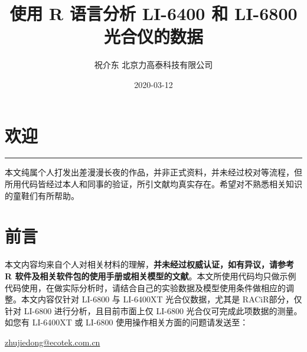 \documentclass[
]{krantz}
\title{使用 R 语言分析 LI-6400 和 LI-6800 光合仪的数据}
\author{祝介东 北京力高泰科技有限公司}
\date{2020-03-12}
\begin{document}
\maketitle





\thispagestyle{empty}

\setlength{\abovedisplayskip}{-5pt}
\setlength{\abovedisplayshortskip}{-5pt}

{
\hypersetup{linkcolor=}
\setcounter{tocdepth}{2}
\tableofcontents
}
\listoftables
\listoffigures
\hypertarget{welcome}{%
\chapter*{欢迎}\label{welcome}}


\begin{center}\rule{0.5\linewidth}{0.5pt}\end{center}

本文纯属个人打发出差漫漫长夜的作品，并非正式资料，并未经过校对等流程，但所用代码皆经过本人和同事的验证，所引文献均真实存在。希望对不熟悉相关知识的童鞋们有所帮助。

\frontmatter

\hypertarget{frontmatter}{%
\chapter*{前言}\label{frontmatter}}


本文内容均来自个人对相关材料的理解，\textbf{并未经过权威认证，如有异议，请参考 R 软件及相关软件包的使用手册或相关模型的文献}。本文所使用代码均只做示例代码使用，在做实际分析时，请结合自己的实验数据及模型使用条件做相应的调整。本文内容仅针对
LI-6800 与 LI-6400XT 光合仪数据，尤其是 RACiR\texttrademark 部分，仅针对 LI-6800
进行分析，且目前市面上仅 LI-6800 光合仪可完成此项数据的测量。如您有 LI-6400XT 或 LI-6800 使用操作相关方面的问题请发送至：

\url{zhujiedong@ecotek.com.cn}
\end{document}
